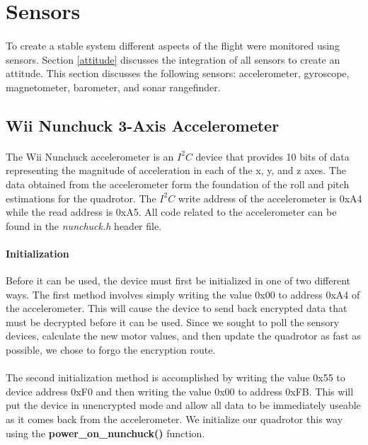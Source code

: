 \section{Sensors}
\paragraph{}
To create a stable system different aspects of the flight were monitored using sensors. Section \ref{attitude} discusses the integration of all sensors to create an attitude. This section discusses the following sensors: accelerometer, gyroscope, magnetometer, barometer, and sonar rangefinder.

\subsection{Wii Nunchuck 3-Axis Accelerometer}

\paragraph{}
The Wii Nunchuck accelerometer is an $I^{2}C$ device that provides 10 bits of data representing the magnitude of acceleration in each of the x, y, and z axes.  The data obtained from the accelerometer form the foundation of the roll and pitch estimations for the quadrotor.  The $I^{2}C$ write address of the accelerometer is 0xA4 while the read address is 0xA5.  All code related to the accelerometer can be found in the {\it nunchuck.h} header file.

\paragraph{Initialization}
Before it can be used, the device must first be initialized in one of two different ways.  The first method involves simply writing the value 0x00 to address 0xA4 of the accelerometer.  This will cause the device to send back encrypted data that must be decrypted before it can be used.  Since we sought to poll the sensory devices, calculate the new motor values, and then update the quadrotor as fast as possible, we chose to forgo the encryption route.

\paragraph{}
The second initialization method is accomplished by writing the value 0x55 to device address 0xF0 and then writing the value 0x00 to address 0xFB.  This will put the device in unencrypted mode and allow all data to be immediately useable as it comes back from the accelerometer.  We initialize our quadrotor this way using the {\bf power\_on\_nunchuck()} function.

